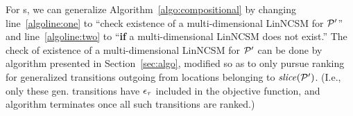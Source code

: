 For \APP{}s, we can generalize Algorithm~\ref{algo:compositional} by changing line~\ref{algoline:one} to ``check existence of a multi-dimensional LinNCSM for $\mathcal{P}'$'' and line~\ref{algoline:two} to ``\textbf{if} a multi-dimensional LinNCSM does not exist.'' The check of existence of a multi-dimensional LinNCSM for $\mathcal{P}'$ can be done by algorithm presented in Section~\ref{sec:algo}, modified so as to only pursue ranking for generalized transitions outgoing from locations belonging to $\mathit{slice}(\mathcal{P}')$. (I.e., only these gen. transitions have $\epsilon_{\tau}$ included in the objective function, and algorithm terminates once all such transitions are ranked.) %





